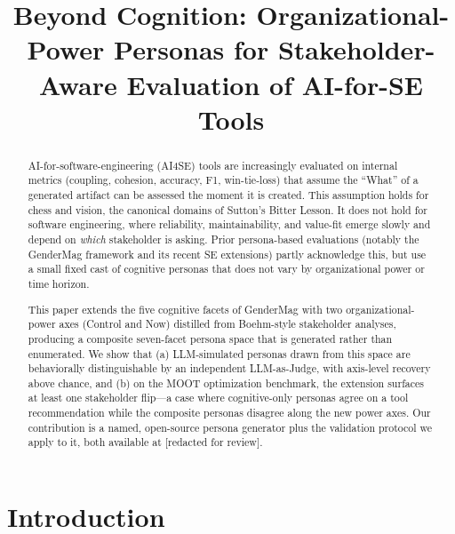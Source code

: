 \documentclass[10pt,conference]{IEEEtran}
\begin{document}
\title{Beyond Cognition: Organizational-Power Personas for Stakeholder-Aware Evaluation of AI-for-SE Tools}

\author{}

\maketitle

\begin{abstract}
AI-for-software-engineering (AI4SE) tools are increasingly evaluated on
internal metrics (coupling, cohesion, accuracy, F1, win-tie-loss) that assume
the ``What'' of a generated artifact can be assessed the moment it is
created. This assumption holds for chess and vision, the canonical domains of
Sutton's Bitter Lesson. It does not hold for software engineering, where
reliability, maintainability, and value-fit emerge slowly and depend on
\emph{which} stakeholder is asking. Prior persona-based evaluations (notably
the GenderMag framework and its recent SE extensions) partly acknowledge
this, but use a small fixed cast of cognitive personas that does not vary by
organizational power or time horizon.

This paper extends the five cognitive facets of GenderMag with two
organizational-power axes (\textsf{Control} and \textsf{Now}) distilled from
Boehm-style stakeholder analyses, producing a composite seven-facet persona
space that is generated rather than enumerated. We show that (a) LLM-simulated
personas drawn from this space are behaviorally distinguishable by an
independent LLM-as-Judge, with axis-level recovery above chance, and (b) on
the MOOT optimization benchmark, the extension surfaces at least one
stakeholder flip---a case where cognitive-only personas agree on a tool
recommendation while the composite personas disagree along the new power
axes. Our contribution is a named, open-source persona generator plus the
validation protocol we apply to it, both available at
\textsf{[redacted for review]}.
\end{abstract}

\section{Introduction}
\end{document}
